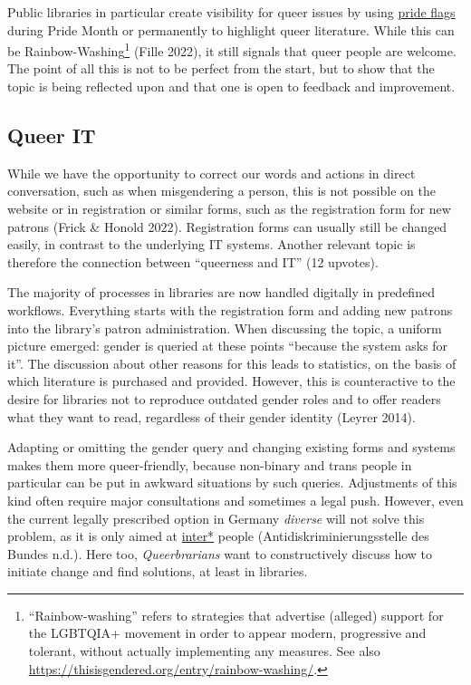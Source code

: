 \documentclass[a4paper,
fontsize=11pt,
oneside,
numbers=noperiodatend,
parskip=half-,
bibliography=totoc,
final
]{scrartcl}
\begin{document}
Public libraries in particular create visibility for queer issues by
using \href{https://www.hrc.org/resources/lgbtq-pride-flags}{pride
flags} during Pride Month or permanently to highlight queer literature.
While this can be Rainbow-Washing\footnote{\enquote{Rainbow-washing} refers to
  strategies that advertise (alleged) support for the LGBTQIA+ movement
  in order to appear modern, progressive and tolerant, without actually
  implementing any measures. See also
  \url{https://thisisgendered.org/entry/rainbow-washing/}.} (Fille
2022), it still signals that queer people are welcome. The point of all
this is not to be perfect from the start, but to show that the topic is
being reflected upon and that one is open to feedback and improvement.

\hypertarget{queer-it}{%
\subsection{Queer IT}\label{queer-it}}

While we have the opportunity to correct our words and actions in direct
conversation, such as when misgendering a person, this is not possible
on the website or in registration or similar forms, such as the
registration form for new patrons (Frick \& Honold 2022). Registration
forms can usually still be changed easily, in contrast to the underlying
IT systems. Another relevant topic is therefore the connection between
\enquote{queerness and IT} (12 upvotes).

The majority of processes in libraries are now handled digitally in
predefined workflows. Everything starts with the registration form and
adding new patrons into the library's patron
administration. When discussing the topic, a uniform picture emerged:
gender is queried at these points \enquote{because the system asks for it}. The
discussion about other reasons for this leads to statistics, on the
basis of which literature is purchased and provided. However, this is
counteractive to the desire for libraries not to reproduce outdated
gender roles and to offer readers what they want to read, regardless of
their gender identity (Leyrer 2014).

Adapting or omitting the gender query and changing existing forms and
systems makes them more queer-friendly, because non-binary and trans
people in particular can be put in awkward situations by such queries.
Adjustments of this kind often require major consultations and sometimes
a legal push. However, even the current legally prescribed option in
Germany \emph{diverse} will not solve this problem, as it is only aimed
at \href{https://lgbtqia.mywikis.wiki/wiki/Intersex}{inter*} people
(Antidiskriminierungsstelle des Bundes n.d.). Here too,
\emph{Queerbrarians} want to constructively discuss how to initiate
change and find solutions, at least in libraries.
\end{document}
